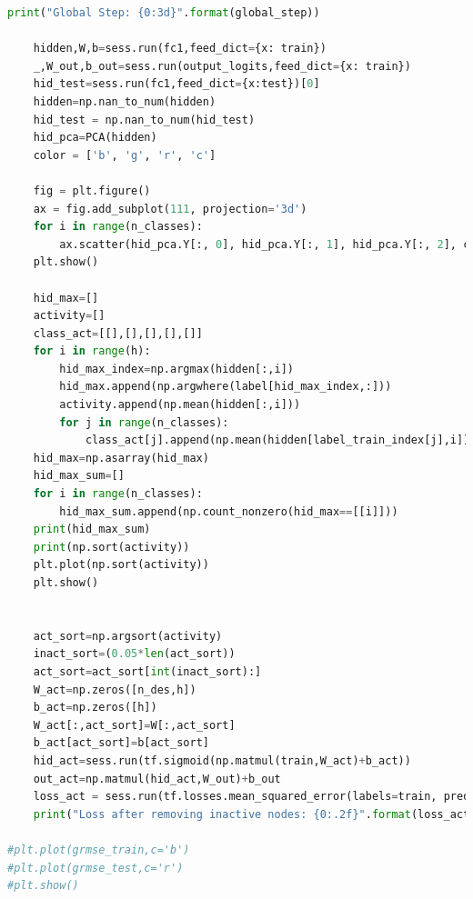 \documentclass{article}
\begin{document}
\begin{lstlisting}[language=Python]
    print("Global Step: {0:3d}".format(global_step))

    hidden,W,b=sess.run(fc1,feed_dict={x: train})
    _,W_out,b_out=sess.run(output_logits,feed_dict={x: train})
    hid_test=sess.run(fc1,feed_dict={x:test})[0]
    hidden=np.nan_to_num(hidden)
    hid_test = np.nan_to_num(hid_test)
    hid_pca=PCA(hidden)
    color = ['b', 'g', 'r', 'c']

    fig = plt.figure()
    ax = fig.add_subplot(111, projection='3d')
    for i in range(n_classes):
        ax.scatter(hid_pca.Y[:, 0], hid_pca.Y[:, 1], hid_pca.Y[:, 2], c=color[i])
    plt.show()

    hid_max=[]
    activity=[]
    class_act=[[],[],[],[],[]]
    for i in range(h):
        hid_max_index=np.argmax(hidden[:,i])
        hid_max.append(np.argwhere(label[hid_max_index,:]))
        activity.append(np.mean(hidden[:,i]))
        for j in range(n_classes):
            class_act[j].append(np.mean(hidden[label_train_index[j],i]))
    hid_max=np.asarray(hid_max)
    hid_max_sum=[]
    for i in range(n_classes):
        hid_max_sum.append(np.count_nonzero(hid_max==[[i]]))
    print(hid_max_sum)
    print(np.sort(activity))
    plt.plot(np.sort(activity))
    plt.show()


    act_sort=np.argsort(activity)
    inact_sort=(0.05*len(act_sort))
    act_sort=act_sort[int(inact_sort):]
    W_act=np.zeros([n_des,h])
    b_act=np.zeros([h])
    W_act[:,act_sort]=W[:,act_sort]
    b_act[act_sort]=b[act_sort]
    hid_act=sess.run(tf.sigmoid(np.matmul(train,W_act)+b_act))
    out_act=np.matmul(hid_act,W_out)+b_out
    loss_act = sess.run(tf.losses.mean_squared_error(labels=train, predictions=out_act))
    print("Loss after removing inactive nodes: {0:.2f}".format(loss_act))

#plt.plot(grmse_train,c='b')
#plt.plot(grmse_test,c='r')
#plt.show()


\end{lstlisting}
\end{document}
